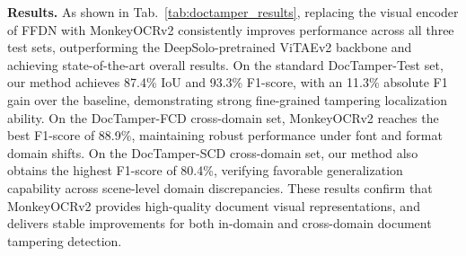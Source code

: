 \documentclass{article}
\begin{document}
    \textbf{Results.} As shown in Tab.~\ref{tab:doctamper_results}, replacing the visual encoder of FFDN with MonkeyOCRv2 consistently improves performance across all three test sets, outperforming the DeepSolo-pretrained ViTAEv2 backbone and achieving state-of-the-art overall results. On the standard DocTamper-Test set, our method achieves 87.4\% IoU and 93.3\% F1-score, with an 11.3\% absolute F1 gain over the baseline, demonstrating strong fine-grained tampering localization ability. On the DocTamper-FCD cross-domain set, MonkeyOCRv2 reaches the best F1-score of 88.9\%, maintaining robust performance under font and format domain shifts. On the DocTamper-SCD cross-domain set, our method also obtains the highest F1-score of 80.4\%, verifying favorable generalization capability across scene-level domain discrepancies. These results confirm that MonkeyOCRv2 provides high-quality document visual representations, and delivers stable improvements for both in-domain and cross-domain document tampering detection.
\end{document}
